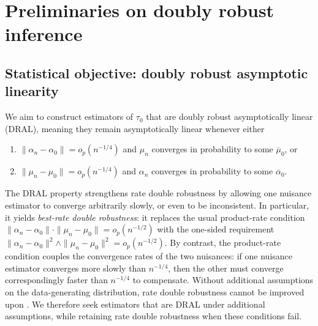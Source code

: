 \documentclass[11pt]{article}
\theoremstyle{plain}
\begin{document}



 
\section{Preliminaries on doubly robust inference}
\label{section:prelimDRinference}

\subsection{Statistical objective: doubly robust asymptotic linearity}

We aim to construct estimators of \( \tau_0 \) that are doubly robust
asymptotically linear (DRAL), meaning they remain asymptotically linear whenever
either
\begin{enumerate}
    \item[(i)] $\|\alpha_n-\alpha_0\| = o_p(n^{-1/4})$ and $\mu_n$ converges in
    probability to some $\overline{\mu}_0$, or
    \item[(ii)] $\|\mu_n - \mu_0\|= o_p(n^{-1/4})$ and $\alpha_n$ converges in
    probability to some $\overline{\alpha}_0$.
\end{enumerate}
The DRAL property strengthens rate double robustness by allowing one nuisance
estimator to converge arbitrarily slowly, or even to be inconsistent. In
particular, it yields \emph{best-rate double robustness}: it replaces the usual
product-rate condition \( \| \alpha_n - \alpha_0 \| \cdot \| \mu_n - \mu_0 \| =
o_p(n^{-1/2}) \) with the one-sided requirement \( \| \alpha_n - \alpha_0 \|^2
\wedge \| \mu_n - \mu_0 \|^2 = o_p(n^{-1/2}) \). By contrast, the product-rate
condition couples the convergence rates of the two nuisances: if one nuisance
estimator converges more slowly than \(n^{-1/4}\), then the other must converge
correspondingly faster than \(n^{-1/4}\) to compensate. Without additional
assumptions on the data-generating distribution, rate double robustness cannot
be improved upon \citep{balakrishnan2023fundamental, jin2024structure,
jin2025sharp}. We therefore seek estimators that are DRAL under additional
assumptions, while retaining rate double robustness when these conditions fail.
\end{document}

